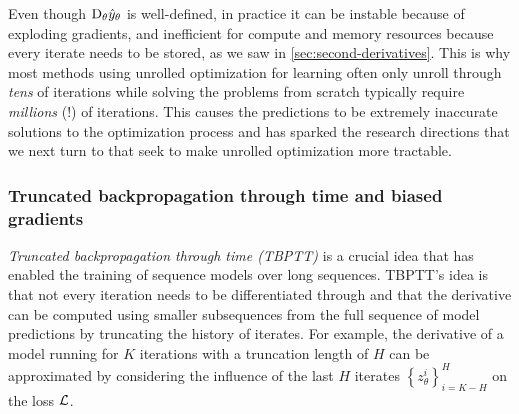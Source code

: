 \documentclass[twoside,11pt]{article}
\begin{document}
Even though $\mathrm{D}_\theta \hat y_\theta$ is well-defined,
in practice it can be
instable because of exploding gradients,
and inefficient for compute and memory resources because
every iterate needs to be stored,
as we saw in \cref{sec:second-derivatives}.
This is why most methods using unrolled optimization for learning
often only unroll through \emph{tens} of iterations
\citep{metz2016unrolled,belanger2017end,foerster2017learning,finn2017model}
while solving the problems from scratch typically
require \emph{millions} (!) of iterations.
This causes the predictions to be extremely inaccurate solutions
to the optimization process and has sparked the research directions
that we next turn to that seek to make unrolled optimization
more tractable.

\subsubsection{Truncated backpropagation through time and biased gradients}
\begin{center}
\end{center}
\vspace{-10mm}

\emph{Truncated backpropagation through time (TBPTT)}
\citep{werbos1990backpropagation,jaeger2002tutorial}
is a crucial idea that has enabled the
training of sequence models over long sequences.
TBPTT's idea is that not every iteration needs to be
differentiated through and that the derivative
can be computed using smaller subsequences from
the full sequence of model predictions by
truncating the history of iterates.
For example, the derivative of a model running
for $K$ iterations with a truncation length of $H$
can be approximated by considering the
influence of the last $H$ iterates
$\left\{z_\theta^{i}\right\}_{i=K-H}^H$ on the loss ${\mathcal{L}}$.
\end{document}
